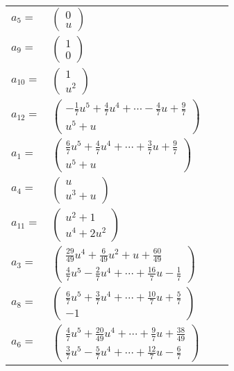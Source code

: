\documentclass[1p]{elsarticle_modified}
\theoremstyle{definition}
\begin{document}
\begin{tabular}{m{7pt} m{180pt} m{7pt} m{180pt} }
\flushright $a_{5}=$&$\begin{pmatrix}0\\u\end{pmatrix}$ \\
\flushright $a_{9}=$&$\begin{pmatrix}1\\0\end{pmatrix}$ \\
\flushright $a_{10}=$&$\begin{pmatrix}1\\u^2\end{pmatrix}$ \\
\flushright $a_{12}=$&$\begin{pmatrix}-\frac{1}{7} u^5+\frac{4}{7} u^4+\cdots-\frac{4}{7} u+\frac{9}{7}\\u^5+u\end{pmatrix}$ \\
\flushright $a_{1}=$&$\begin{pmatrix}\frac{6}{7} u^5+\frac{4}{7} u^4+\cdots+\frac{3}{7} u+\frac{9}{7}\\u^5+u\end{pmatrix}$ \\
\flushright $a_{4}=$&$\begin{pmatrix}u\\u^3+u\end{pmatrix}$ \\
\flushright $a_{11}=$&$\begin{pmatrix}u^2+1\\u^4+2 u^2\end{pmatrix}$ \\
\flushright $a_{3}=$&$\begin{pmatrix}\frac{29}{49} u^4+\frac{6}{49} u^2+u+\frac{60}{49}\\\frac{4}{7} u^5-\frac{2}{7} u^4+\cdots+\frac{16}{7} u-\frac{1}{7}\end{pmatrix}$ \\
\flushright $a_{8}=$&$\begin{pmatrix}\frac{6}{7} u^5+\frac{3}{7} u^4+\cdots+\frac{10}{7} u+\frac{5}{7}\\-1\end{pmatrix}$ \\
\flushright $a_{6}=$&$\begin{pmatrix}\frac{4}{7} u^5+\frac{20}{49} u^4+\cdots+\frac{9}{7} u+\frac{38}{49}\\\frac{3}{7} u^5-\frac{5}{7} u^4+\cdots+\frac{12}{7} u-\frac{6}{7}\end{pmatrix}$ \\

\end{tabular}
\end{document}
